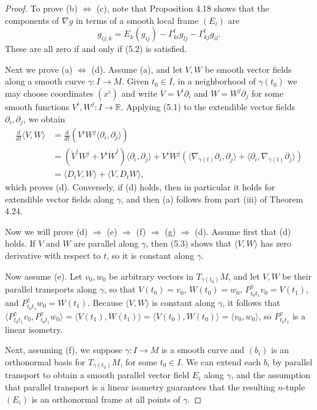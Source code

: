 \begin{proposition}
\begin{proof}
To prove (b) $\Leftrightarrow$ (c), note that Proposition 4.18 shows that the components of $\nabla g$ in terms of a smooth local frame $(E_i)$ are
\[
g_{ij;k} = E_k(g_{ij}) - \Gamma^l_{ki}g_{lj} - \Gamma^l_{kj}g_{il}.
\]
These are all zero if and only if (5.2) is satisfied.

Next we prove (a) $\Leftrightarrow$ (d). Assume (a), and let $V,W$ be smooth vector fields along a smooth curve $\gamma\colon I \to M$. Given $t_0 \in I$, in a neighborhood of $\gamma(t_0)$ we may choose coordinates $(x^i)$ and write $V = V^i\partial_i$ and $W = W^j\partial_j$ for some smooth functions $V^i, W^j\colon I \to \mathbb{R}$. Applying (5.1) to the extendible vector fields $\partial_i, \partial_j$, we obtain
\begin{align*}
\frac{d}{dt}\langle V,W\rangle &= \frac{d}{dt}\left(V^i W^j\langle\partial_i,\partial_j\rangle\right) \\
&= \left(\dot{V}^i W^j + V^i \dot{W}^j\right)\langle\partial_i,\partial_j\rangle + V^i W^j\left(\langle\nabla_{\dot{\gamma}(t)}\partial_i,\partial_j\rangle + \langle\partial_i,\nabla_{\dot{\gamma}(t)}\partial_j\rangle\right) \\
&= \langle D_t V, W\rangle + \langle V, D_t W\rangle,
\end{align*}
which proves (d). Conversely, if (d) holds, then in particular it holds for extendible vector fields along $\gamma$, and then (a) follows from part (iii) of Theorem 4.24.

Now we will prove (d) $\Rightarrow$ (e) $\Rightarrow$ (f) $\Rightarrow$ (g) $\Rightarrow$ (d). Assume first that (d) holds. If $V$ and $W$ are parallel along $\gamma$, then (5.3) shows that $\langle V,W\rangle$ has zero derivative with respect to $t$, so it is constant along $\gamma$.

Now assume (e). Let $v_0, w_0$ be arbitrary vectors in $T_{\gamma(t_0)}M$, and let $V, W$ be their parallel transports along $\gamma$, so that $V(t_0) = v_0$, $W(t_0) = w_0$, $P^{\gamma}_{t_0t_1} v_0 = V(t_1)$, and $P^{\gamma}_{t_0t_1} w_0 = W(t_1)$. Because $\langle V, W\rangle$ is constant along $\gamma$, it follows that $\langle P^{\gamma}_{t_0t_1} v_0, P^{\gamma}_{t_0t_1} w_0 \rangle = \langle V(t_1), W(t_1) \rangle = \langle V(t_0), W(t_0) \rangle = \langle v_0, w_0 \rangle$, so $P^{\gamma}_{t_0t_1}$ is a linear isometry.

Next, assuming (f), we suppose $\gamma : I \to M$ is a smooth curve and $(b_i)$ is an orthonormal basis for $T_{\gamma(t_0)}M$, for some $t_0 \in I$. We can extend each $b_i$ by parallel transport to obtain a smooth parallel vector field $E_i$ along $\gamma$, and the assumption that parallel transport is a linear isometry guarantees that the resulting $n$-tuple $(E_i)$ is an orthonormal frame at all points of $\gamma$.


\end{proof}
\end{proposition}
